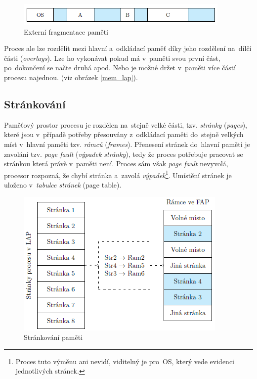 \begin{figure}[ht]
	\centering
	\includegraphics[scale=1]{images/mem_fragmentace.png}
	\caption{Externí fragmentace paměti}
	\label{mem_fragmentace}
\end{figure}

Proces ale lze rozdělit mezi hlavní a~odkládací paměť díky jeho rozdělení na~dílčí části (\emph{overlays}). Lze ho vykonávat pokud má v~paměti svou první část, po~dokončení se načte druhá apod. Nebo je možné držet v~paměti více částí procesu najednou. (viz obrázek \ref{mem_lap}).

\subsection{Stránkování}

Paměťový prostor procesu je rozdělen na~stejně velké části, tzv. \emph{stránky} (\emph{pages}), které jsou v~případě potřeby přesouvány z~odkládací paměti do~stejně velkých míst v~hlavní paměti tzv. \emph{rámců} (\emph{frames}). Přenesení stránek do~hlavní paměti je zavolání tzv. \emph{page fault} (\emph{výpadek stránky}), tedy že proces potřebuje pracovat se stránkou která právě v~paměti není. Proces sám však \emph{page fault} nevyvolá, procesor rozpozná, že chybí stránka a~zavolá \emph{výpadek}\footnote{Proces tuto výměnu ani nevidí, viditelný je pro~OS, který vede evidenci jednotlivých stránek.}. Umístění stránek je uloženo v~\emph{tabulce stránek} (page table).

\begin{figure}[ht]
	\centering
	\includegraphics[scale=1]{images/mem_page_table.png}
	\caption{Stránkování paměti}
\end{figure}

